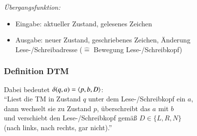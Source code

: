\documentclass[onlymath]{beamer}
\begin{document}
\begin{frame}
\emph{Übergangsfunktion:}
\begin{itemize}
\item \alert{Eingabe:} aktueller Zustand, gelesenes Zeichen
\item \alert{Ausgabe:} neuer Zustand, geschriebenes Zeichen, Änderung Lese-/Schreibadresse (${}\hat{=}{}$ Bewegung Lese-/Schreibkopf)
\end{itemize}

\end{frame}

\begin{frame}\frametitle{Definition DTM}


\alert{Dabei bedeutet $\delta(q,a)=\langle{p,b,D}\rangle$:}\\
\hspace{5mm}"`Liest die TM in Zustand $q$ unter dem Lese-/Schreibkopf ein $a$,\\
\hspace{5.8mm}dann wechselt sie zu Zustand $p$, überschreibt das $a$ mit $b$\\
\hspace{5.8mm}und verschiebt den Lese-/Schreibkopf gemäß $D\in\{L,R,N\}$\\
\hspace{5.8mm}(nach links, nach rechts, gar nicht)."'

\end{frame}
\end{document}
